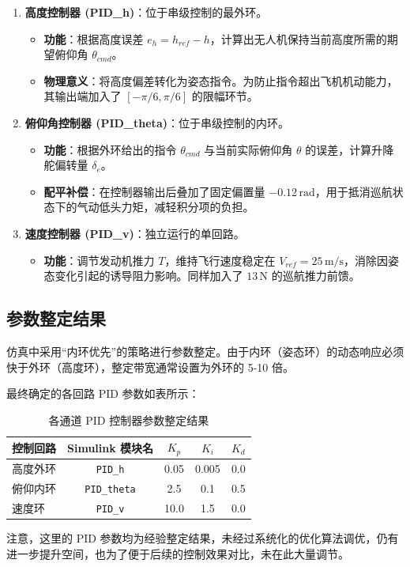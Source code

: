 \documentclass[UTF8, a4paper, 12pt]{ctexart}
\begin{document}
\begin{enumerate}
    \item \textbf{高度控制器 (PID\_h)}：位于串级控制的最外环。
    \begin{itemize}
        \item \textbf{功能}：根据高度误差 $e_h = h_{ref} - h$，计算出无人机保持当前高度所需的期望俯仰角 $\theta_{cmd}$。
        \item \textbf{物理意义}：将高度偏差转化为姿态指令。为防止指令超出飞机机动能力，其输出端加入了 $[-\pi/6, \pi/6]$ 的限幅环节。
    \end{itemize}

    \item \textbf{俯仰角控制器 (PID\_theta)}：位于串级控制的内环。
    \begin{itemize}
        \item \textbf{功能}：根据外环给出的指令 $\theta_{cmd}$ 与当前实际俯仰角 $\theta$ 的误差，计算升降舵偏转量 $\delta_e$。
        \item \textbf{配平补偿}：在控制器输出后叠加了固定偏置量 $-0.12\,\text{rad}$，用于抵消巡航状态下的气动低头力矩，减轻积分项的负担。
    \end{itemize}

    \item \textbf{速度控制器 (PID\_v)}：独立运行的单回路。
    \begin{itemize}
        \item \textbf{功能}：调节发动机推力 $T$，维持飞行速度稳定在 $V_{ref} = 25\,\text{m/s}$，消除因姿态变化引起的诱导阻力影响。同样加入了 $13\,\text{N}$ 的巡航推力前馈。
    \end{itemize}
\end{enumerate}

\subsection{参数整定结果}
仿真中采用“内环优先”的策略进行参数整定。由于内环（姿态环）的动态响应必须快于外环（高度环），整定带宽通常设置为外环的 5-10 倍。

最终确定的各回路 PID 参数如表所示：

\begin{table}[H]
    \centering
    \caption{各通道 PID 控制器参数整定结果}
    \label{tab:pid_params_final}
    \begin{tabular}{l c c c c}
        \toprule
        \textbf{控制回路} & \textbf{Simulink 模块名} & \textbf{$K_p$} & \textbf{$K_i$} & \textbf{$K_d$} \\
        \midrule
        高度外环 & \texttt{PID\_h} & 0.05 & 0.005 & 0.0 \\
        俯仰内环 & \texttt{PID\_theta} & 2.5 & 0.1 & 0.5 \\
        速度环 & \texttt{PID\_v} & 10.0 & 1.5 & 0.0 \\
        \bottomrule
    \end{tabular}
\end{table}
注意，这里的 PID 参数均为经验整定结果，未经过系统化的优化算法调优，仍有进一步提升空间，也为了便于后续的控制效果对比，未在此大量调节。
\end{document}
